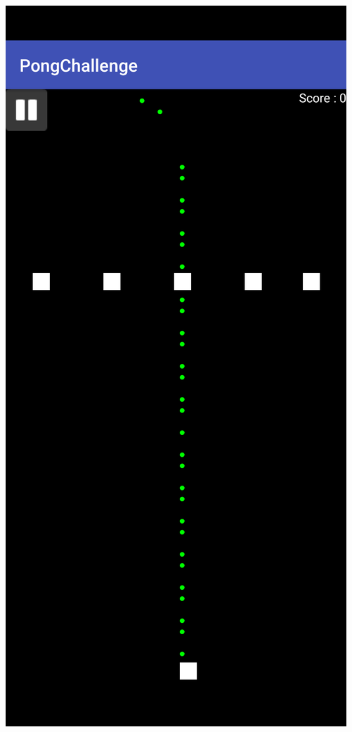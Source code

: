 \documentclass{article}
\begin{document}
\begin{center}
  \includegraphics[scale=0.08]{Screenshot.png}

\end{center}
\end{document}

